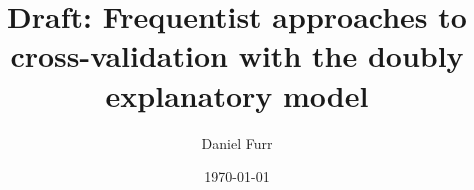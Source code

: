 \documentclass{article}
\begin{document}
\author{Daniel Furr}
\date{\today}

%

\title{Draft: Frequentist approaches to cross-validation with the doubly explanatory model}
\maketitle


%

\printbibliography
\end{document}
